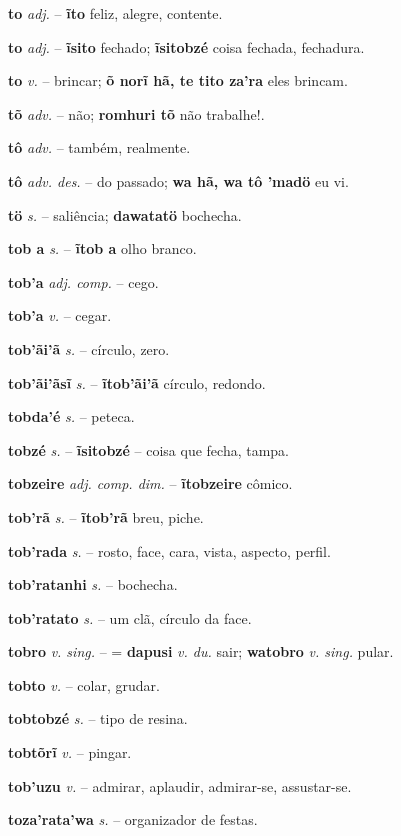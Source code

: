 \textbf{to} \textit{adj.} -- \textbf{ĩto} feliz, alegre, contente.

\textbf{to} \textit{adj.} -- \textbf{ĩsito} fechado; \textbf{ĩsitobzé} coisa fechada, fechadura.

\textbf{to} \textit{v.} -- brincar; \textbf{õ norĩ hã, te tito za'ra} eles brincam.

\textbf{tõ} \textit{adv.} -- não; \textbf{romhuri tõ} não trabalhe!.

\textbf{tô} \textit{adv.} -- também, realmente.

\textbf{tô} \textit{adv. des.} -- do passado; \textbf{wa hã, wa tô 'madö} eu vi.

\textbf{tö} \textit{s.} -- saliência; \textbf{dawatatö} bochecha.

\textbf{tob a} \textit{s.} -- \textbf{ĩtob a} olho branco.

\textbf{tob'a} \textit{adj. comp.} -- cego.

\textbf{tob'a} \textit{v.} -- cegar.

\textbf{tob'ãi'ã} \textit{s.} -- círculo, zero.

\textbf{tob'ãi'ãsĩ} \textit{s.} -- \textbf{ĩtob'ãi'ã} círculo, redondo.

\textbf{tobda'é} \textit{s.} -- peteca.

\textbf{tobzé} \textit{s.} -- \textbf{ĩsitobzé} -- coisa que fecha, tampa.

\textbf{tobzeire} \textit{adj. comp. dim.} -- \textbf{ĩtobzeire} cômico.

\textbf{tob'rã} \textit{s.} -- \textbf{ĩtob'rã} breu, piche.

\textbf{tob'rada} \textit{s.} -- rosto, face, cara, vista, aspecto, perfil.

\textbf{tob'ratanhi} \textit{s.} -- bochecha.

\textbf{tob'ratato} \textit{s.} -- um clã, círculo da face.

\textbf{tobro} \textit{v. sing.} -- = \textbf{dapusi} \textit{v. du.} sair; \textbf{watobro} \textit{v. sing.} pular.

\textbf{tobto} \textit{v.} -- colar, grudar.

\textbf{tobtobzé} \textit{s.} -- tipo de resina.

\textbf{tobtõrĩ} \textit{v.} -- pingar.

\textbf{tob'uzu} \textit{v.} -- admirar, aplaudir, admirar-se, assustar-se.

\textbf{toza'rata'wa} \textit{s.} -- organizador de festas.

